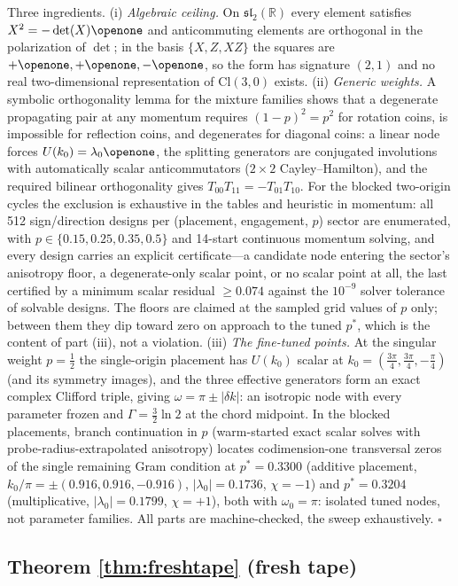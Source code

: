 \documentclass[aps,prd,twocolumn,superscriptaddress,nofootinbib,floatfix]{revtex4-2}
\begin{document}
Three ingredients. (i) \emph{Algebraic ceiling.} On
$\mathfrak{sl}_2(\mathbb R)$ every element satisfies
$X^2=-\det(X)\openone$ and anticommuting elements are orthogonal in the
polarization of $\det$; in the basis $\{X,Z,XZ\}$ the squares are
$+\openone,+\openone,-\openone$, so the form has signature $(2,1)$ and no
real two-dimensional representation of $\mathrm{Cl}(3,0)$ exists.
(ii) \emph{Generic weights.} A symbolic orthogonality lemma for the
mixture families shows that a degenerate propagating pair at any momentum
requires $(1-p)^2=p^2$ for rotation coins, is impossible for reflection
coins, and degenerates for diagonal coins: a linear node forces
$U(k_0)=\lambda_0\openone$, the splitting generators are conjugated
involutions with automatically scalar anticommutators ($2\times2$
Cayley--Hamilton), and the required bilinear orthogonality gives
$T_{00}T_{11}=-T_{01}T_{10}$. For the blocked two-origin cycles the
exclusion is exhaustive in the tables and heuristic in momentum: all
512 sign/direction designs per (placement, engagement, $p$) sector are
enumerated, with $p\in\{0.15,0.25,0.35,0.5\}$ and 14-start continuous
momentum solving, and every design carries an explicit certificate---a
candidate node entering the sector's anisotropy floor, a
degenerate-only scalar point, or no scalar point at all, the last
certified by a minimum scalar residual $\ge0.074$ against the $10^{-9}$
solver tolerance of solvable designs. The floors are claimed at the
sampled grid values of $p$ only; between them they dip toward zero on
approach to the tuned $p^*$, which is the content of part (iii), not a
violation.
(iii) \emph{The fine-tuned points.} At the singular weight $p=\tfrac12$
the single-origin placement has $U(k_0)$ scalar at
$k_0=(\tfrac{3\pi}4,\tfrac{3\pi}4,-\tfrac\pi4)$ (and its symmetry
images), and the three effective generators form an exact complex
Clifford triple, giving $\omega=\pi\pm|\delta k|$: an isotropic node with
every parameter frozen and $\Gamma=\tfrac32\ln2$ at the chord midpoint.
In the blocked placements, branch continuation in $p$ (warm-started exact
scalar solves with probe-radius-extrapolated anisotropy) locates
codimension-one transversal zeros of the single remaining Gram condition
at $p^*=0.3300$ (additive placement,
$k_0/\pi=\pm(0.916,0.916,-0.916)$, $|\lambda_0|=0.1736$, $\chi=-1$) and
$p^*=0.3204$ (multiplicative, $|\lambda_0|=0.1799$, $\chi=+1$), both
with $\omega_0=\pi$: isolated tuned nodes, not parameter families. All parts are machine-checked, the sweep exhaustively.
\hfill$\square$

\subsection{Theorem \ref{thm:freshtape} (fresh tape)}
\end{document}

